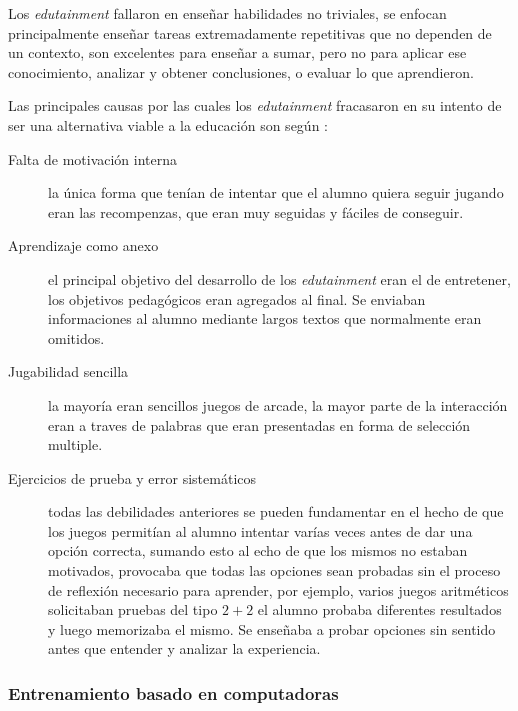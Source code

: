 Los \emph{edutainment} fallaron en enseñar habilidades no triviales, se enfocan
principalmente enseñar tareas extremadamente repetitivas que no dependen de un
contexto\cite{charsky:2010}\cite{egenfeldt2007third}\cite{bruckman1999can}, son
excelentes para enseñar a sumar, pero no para aplicar ese conocimiento, analizar
y obtener conclusiones, o evaluar lo que aprendieron.

Las principales causas por las cuales los \emph{edutainment} fracasaron en su
intento de ser una alternativa viable a la educación son según
\cite{egenfeldt2007third}: 

\begin{description}

    \item[Falta de motivación interna] la única forma que tenían de intentar que
	    el alumno quiera seguir jugando eran las recompenzas, que eran muy
	    seguidas y fáciles de conseguir.

    \item[Aprendizaje como anexo] el principal objetivo del desarrollo de los
	    \emph{edutainment} eran el de entretener, los objetivos pedagógicos
	    eran agregados al final. Se enviaban informaciones al alumno
	    mediante largos textos que normalmente eran omitidos.
    
    \item[Jugabilidad sencilla] la mayoría eran sencillos juegos de arcade, la
	    mayor parte de la interacción eran a traves de palabras que eran
	    presentadas en forma de selección multiple. 

    \item[Ejercicios de prueba y error sistemáticos] todas las debilidades
	    anteriores se pueden fundamentar en el hecho de que los juegos
	    permitían al alumno intentar varías veces antes de dar una opción
	    correcta, sumando esto al echo de que los mismos no estaban
	    motivados, provocaba que todas las opciones sean probadas sin el
	    proceso de reflexión necesario para aprender, por ejemplo, varios
	    juegos aritméticos solicitaban pruebas del tipo
	    \begin{math}{2+2}\end{math} el alumno probaba diferentes resultados
	    y luego memorizaba el mismo. Se enseñaba a probar opciones sin
	    sentido antes que entender y analizar la experiencia.

\end{description}

\subsubsection{Entrenamiento basado en computadoras}

